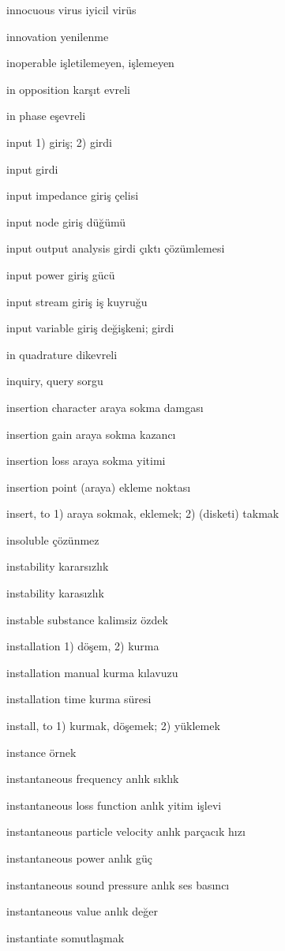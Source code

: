 \documentclass[12pt,fleqn]{article}\usepackage{../../common}
\begin{document}
innocuous virus iyicil virüs

innovation yenilenme

inoperable işletilemeyen, işlemeyen

in opposition karşıt evreli

in phase eşevreli

input 1) giriş; 2) girdi

input girdi

input impedance giriş çelisi

input node giriş düğümü

input output analysis girdi çıktı çözümlemesi

input power giriş gücü

input stream giriş iş kuyruğu

input variable giriş değişkeni; girdi

in quadrature dikevreli

inquiry, query sorgu

insertion character araya sokma damgası

insertion gain araya sokma kazancı

insertion loss araya sokma yitimi

insertion point (araya) ekleme noktası

insert, to 1) araya sokmak, eklemek; 2) (disketi) takmak

insoluble çözünmez

instability kararsızlık

instability karasızlık

instable substance kalimsiz özdek

installation 1) döşem, 2) kurma

installation manual kurma kılavuzu

installation time kurma süresi

install, to 1) kurmak, döşemek; 2) yüklemek

instance örnek

instantaneous frequency anlık sıklık

instantaneous loss function anlık yitim işlevi

instantaneous particle velocity anlık parçacık hızı

instantaneous power anlık güç

instantaneous sound pressure anlık ses basıncı

instantaneous value anlık değer

instantiate somutlaşmak
\end{document}
